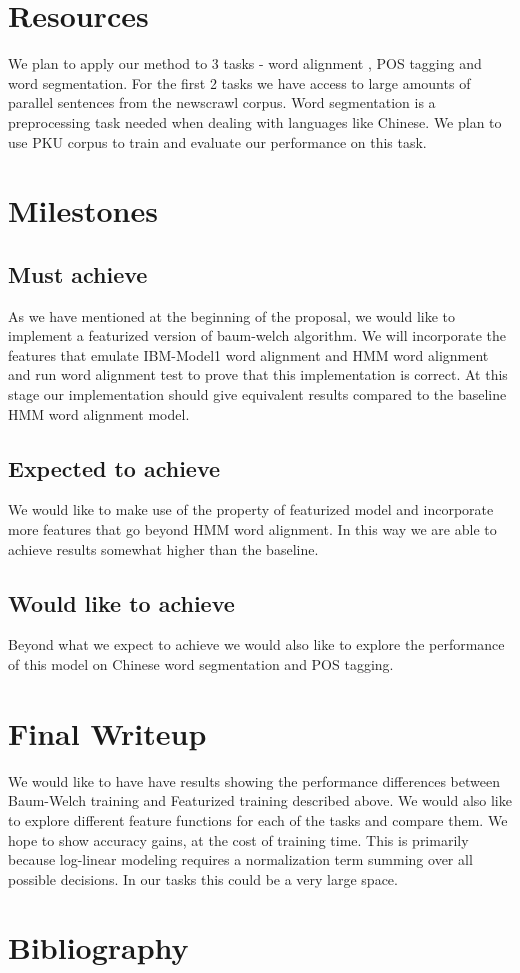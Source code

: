\documentclass[11pt]{article}
\begin{document}
\section{Resources}
We plan to apply our method to 3 tasks - word alignment , POS tagging and word segmentation. For the first 2 tasks we have access to large amounts of parallel sentences from the newscrawl corpus. Word segmentation is a preprocessing task needed when dealing with languages like Chinese. We plan to use PKU corpus to train and evaluate our performance on this task.

\section{Milestones}
\subsection{Must achieve}
As we have mentioned at the beginning of the proposal, we would like to implement a featurized version of baum-welch algorithm. We will incorporate the features that emulate IBM-Model1 word alignment and HMM word alignment and run word alignment test to prove that this implementation is correct. At this stage our implementation should give equivalent results compared to the baseline HMM word alignment model.

\subsection{Expected to achieve}
We would like to make use of the property of featurized model and incorporate more features that go beyond HMM word alignment. In this way we are able to achieve results somewhat higher than the baseline.

\subsection{Would like to achieve}
Beyond what we expect to achieve we would also like to explore the performance of this model on Chinese word segmentation and POS tagging.


\section{Final Writeup}
We would like to have have results showing the performance differences between Baum-Welch training and Featurized training described above. We would also like to explore different feature functions for each of the tasks and compare them. We hope to show accuracy gains, at the cost of training time. This is primarily because log-linear modeling requires a normalization term summing over all possible decisions. In our tasks this could be a very large space. 

\section{Bibliography}


\end{document}
